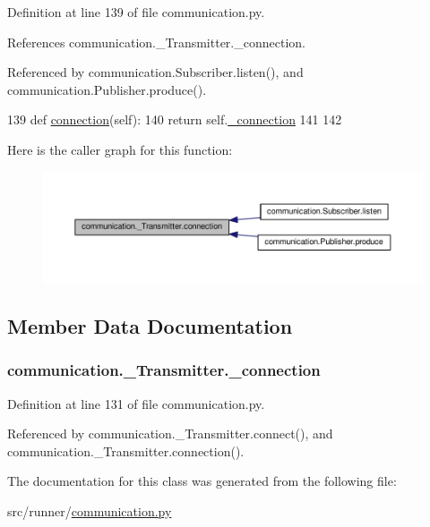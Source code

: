 Definition at line 139 of file communication.\+py.



References communication.\+\_\+\+Transmitter.\+\_\+connection.



Referenced by communication.\+Subscriber.\+listen(), and communication.\+Publisher.\+produce().


\begin{DoxyCode}
139     \textcolor{keyword}{def }\hyperlink{classcommunication_1_1__Transmitter_af3f5e819de9b1235db609470d6341d28}{connection}(self):
140         \textcolor{keywordflow}{return} self.\hyperlink{classcommunication_1_1__Transmitter_afe9bfe5ee520cc6566dca1806c3589e2}{\_connection}
141 
142 
\end{DoxyCode}


Here is the caller graph for this function\+:\nopagebreak
\begin{figure}[H]
\begin{center}
\leavevmode
\includegraphics[width=350pt]{classcommunication_1_1__Transmitter_af3f5e819de9b1235db609470d6341d28_icgraph}
\end{center}
\end{figure}




\subsection{Member Data Documentation}
\hypertarget{classcommunication_1_1__Transmitter_afe9bfe5ee520cc6566dca1806c3589e2}{}
\subsubsection[{\+\_\+connection}]{\setlength{\rightskip}{0pt plus 5cm}communication.\+\_\+\+Transmitter.\+\_\+connection\hspace{0.3cm}{\ttfamily [private]}}\label{classcommunication_1_1__Transmitter_afe9bfe5ee520cc6566dca1806c3589e2}


Definition at line 131 of file communication.\+py.



Referenced by communication.\+\_\+\+Transmitter.\+connect(), and communication.\+\_\+\+Transmitter.\+connection().



The documentation for this class was generated from the following file\+:\begin{DoxyCompactItemize}
\item 
src/runner/\hyperlink{communication_8py}{communication.\+py}\end{DoxyCompactItemize}
